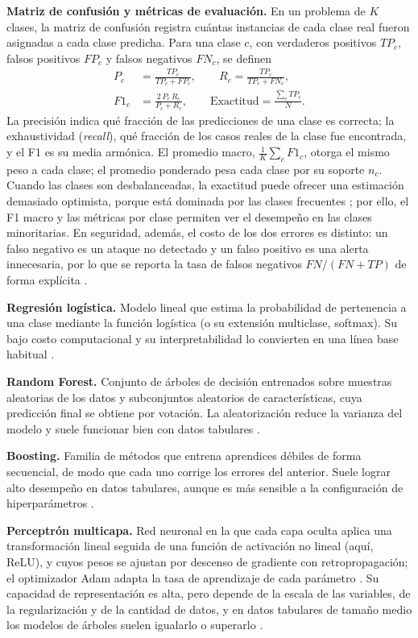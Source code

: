 \documentclass[conference]{IEEEtran}
\begin{document}
\textbf{Matriz de confusión y métricas de evaluación.} En un problema de $K$ clases, la matriz de confusión registra cuántas instancias de cada clase real fueron asignadas a cada clase predicha. Para una clase $c$, con verdaderos positivos $TP_c$, falsos positivos $FP_c$ y falsos negativos $FN_c$, se definen
\begin{align}
P_c &= \frac{TP_c}{TP_c+FP_c}, \qquad R_c = \frac{TP_c}{TP_c+FN_c},\\
F1_c &= \frac{2\,P_c\,R_c}{P_c+R_c}, \qquad \text{Exactitud} = \frac{\sum_c TP_c}{N}.
\end{align}
La precisión indica qué fracción de las predicciones de una clase es correcta; la exhaustividad (\emph{recall}), qué fracción de los casos reales de la clase fue encontrada, y el F1 es su media armónica. El promedio macro, $\frac{1}{K}\sum_c F1_c$, otorga el mismo peso a cada clase; el promedio ponderado pesa cada clase por su soporte $n_c$. Cuando las clases son desbalanceadas, la exactitud puede ofrecer una estimación demasiado optimista, porque está dominada por las clases frecuentes \cite{chicco2020}; por ello, el F1 macro y las métricas por clase permiten ver el desempeño en las clases minoritarias. En seguridad, además, el costo de los dos errores es distinto: un falso negativo es un ataque no detectado y un falso positivo es una alerta innecesaria, por lo que se reporta la tasa de falsos negativos $FN/(FN+TP)$ de forma explícita \cite{ring2019,apruzzese2023}.

\textbf{Regresión logística.} Modelo lineal que estima la probabilidad de pertenencia a una clase mediante la función logística (o su extensión multiclase, softmax). Su bajo costo computacional y su interpretabilidad lo convierten en una línea base habitual \cite{hastie2009,geron2022}.

\textbf{Random Forest.} Conjunto de árboles de decisión entrenados sobre muestras aleatorias de los datos y subconjuntos aleatorios de características, cuya predicción final se obtiene por votación. La aleatorización reduce la varianza del modelo y suele funcionar bien con datos tabulares \cite{hastie2009,geron2022}.

\textbf{Boosting.} Familia de métodos que entrena aprendices débiles de forma secuencial, de modo que cada uno corrige los errores del anterior. Suele lograr alto desempeño en datos tabulares, aunque es más sensible a la configuración de hiperparámetros \cite{hastie2009,geron2022}.

\textbf{Perceptrón multicapa.} Red neuronal en la que cada capa oculta aplica una transformación lineal seguida de una función de activación no lineal (aquí, ReLU), y cuyos pesos se ajustan por descenso de gradiente con retropropagación; el optimizador Adam adapta la tasa de aprendizaje de cada parámetro \cite{bishop2024}. Su capacidad de representación es alta, pero depende de la escala de las variables, de la regularización y de la cantidad de datos, y en datos tabulares de tamaño medio los modelos de árboles suelen igualarlo o superarlo \cite{grinsztajn2022}.
\end{document}
